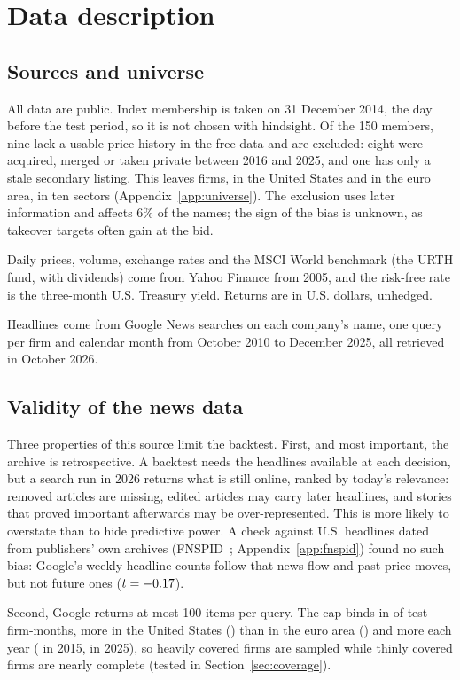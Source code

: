 \section{Data description}\label{sec:data}
\subsection{Sources and universe}
All data are public. Index membership is taken on 31 December 2014, the day before the test period, so it is not chosen with hindsight. Of the 150 members, nine lack a usable price history in the free data and are excluded: eight were acquired, merged or taken private between 2016 and 2025, and one has only a stale secondary listing. This leaves \Firms{} firms, \FirmsUS{} in the United States and \FirmsEU{} in the euro area, in ten sectors (Appendix~\ref{app:universe}). The exclusion uses later information and affects 6\% of the names; the sign of the bias is unknown, as takeover targets often gain at the bid.

Daily prices, volume, exchange rates and the MSCI World benchmark (the URTH fund, with dividends) come from Yahoo Finance from 2005, and the risk-free rate is the three-month U.S. Treasury yield. Returns are in U.S. dollars, unhedged.

Headlines come from Google News searches on each company's name, one query per firm and calendar month from October 2010 to December 2025, all retrieved in October 2026.

\subsection{Validity of the news data}\label{sec:validity}
Three properties of this source limit the backtest. First, and most important, the archive is retrospective. A backtest needs the headlines available at each decision, but a search run in 2026 returns what is still online, ranked by today's relevance: removed articles are missing, edited articles may carry later headlines, and stories that proved important afterwards may be over-represented. This is more likely to overstate than to hide predictive power. A check against \FnWire{} U.S. headlines dated from publishers' own archives (FNSPID~\cite{fnspid}; Appendix~\ref{app:fnspid}) found no such bias: Google's weekly headline counts follow that news flow and past price moves, but not future ones ($t=-0.17$).

Second, Google returns at most 100 items per query. The cap binds in \CapShareTest{} of test firm-months, more in the United States (\CapShareUS{}) than in the euro area (\CapShareEU{}) and more each year (\CapShareFirstTest{} in 2015, \CapShareLastTest{} in 2025), so heavily covered firms are sampled while thinly covered firms are nearly complete (tested in Section~\ref{sec:coverage}).

